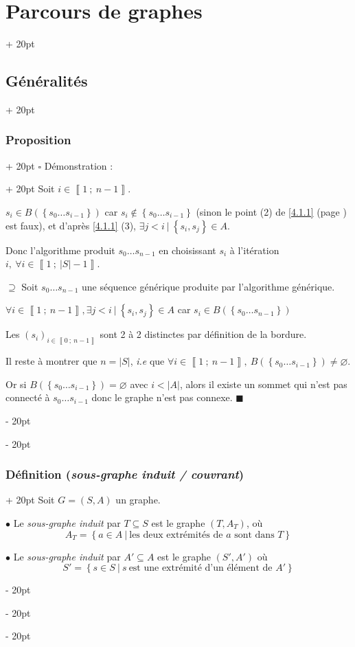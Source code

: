 \documentclass[a4paper, 12pt, twoside]{article}
\newcommand{\nset}[2]{\left\llbracket #1\ ;\ #2 \right\rrbracket}
\newcommand{\set}[1]{\left\{ #1 \right\}}
\newcommand{\abs}[1]{\left\lvert #1 \right\rvert}
\newcommand{\ind}[1][20pt]{\advance\leftskip + #1}
\newcommand{\deind}[1][20pt]{\advance\leftskip - #1}
\newenvironment{indt}[2][20pt]{#2 \par \ind[#1]}{\par \deind} %
\begin{document}
\begin{indt}{\section{Parcours de graphes}}
\begin{indt}{\subsection{Généralités}}
\begin{indt}{\subsubsection{Proposition}}
\begin{indt}{$\square$ Démonstration :}
                    Soit $i \in \nset {1}{n - 1}$.

                    $s_i \in B(\set{s_0 \ldots s_{i - 1}})$ car $s_i \notin \set {s_0 \ldots s_{i - 1}}$ (sinon le point (2) de \ref{4.1.1} (page \pageref{4.1.1}) est faux),
                    et d'après \ref{4.1.1} (3), $\exists j < i\ |\ \set{s_i, s_j} \in A$.

                    Donc l'algorithme produit $s_0 \ldots s_{n - 1}$ en choisissant $s_i$ à l'itération $i,\ \forall i \in \nset{1}{\abs S - 1}$.

                    \vspace{12pt}
                    
                    $\boxed{\supseteq}$ Soit $s_0 \ldots s_{n - 1}$ une séquence générique produite par l'algorithme générique.

                    $\forall i \in \nset 1 {n - 1}, \exists j < i\ |\ \set{s_i, s_j} \in A$ car $s_i \in B(\set{s_0 \ldots s_{n - 1}})$

                    Les $(s_i)_{i \in \nset{0}{n - 1}}$ sont 2 à 2 distinctes par définition de la bordure.

                    Il reste à montrer que $n = \abs S$, \textit{i.e} que $\forall i \in \nset 1 {n - 1},\ B(\set{s_0 \ldots s_{i - 1}}) \neq \varnothing$.

                    Or si $B(\set{s_0 \ldots s_{i - 1}}) = \varnothing$ avec $i < \abs A$, alors il existe un sommet qui n'est pas connecté à $s_0 \ldots s_{i - 1}$ donc le graphe n'est pas connexe. $\blacksquare$
                \end{indt}
            \end{indt}

            \vspace{12pt}
            
            \begin{indt}{\subsubsection{Définition (\textit{sous-graphe induit / couvrant})}}
                Soit $G = (S, A)$ un graphe.

                $\bullet$ Le \textit{sous-graphe induit} par $T \subseteq S$ est le graphe $(T, A_T)$, où
                \[
                    A_T = \set{a \in A\ |\ \text{les deux extrémités de $a$ sont dans $T$}}
                \]

                $\bullet$ Le \textit{sous-graphe induit} par $A' \subseteq A$ est le graphe $(S', A')$ où
                \[
                    S' = \set{s \in S\ |\ s\ \text{est une extrémité d'un élément de } A'}
                \]


\end{indt}
\end{indt}
\end{indt}
\end{document}
